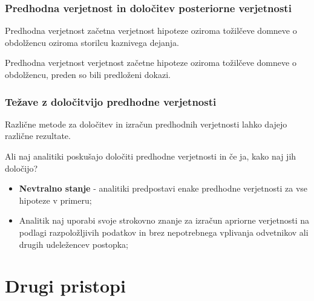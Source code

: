 \documentclass{beamer}
\begin{document}
\begin{frame}
    \frametitle{Predhodna verjetnost in določitev posteriorne verjetnosti}
    \begin{block}{Predhodna verjetnost}
        začetna verjetnost hipoteze oziroma tožilčeve domneve o obdolžencu oziroma storilcu kaznivega dejanja.
    \end{block} \vspace{3mm}
    \begin{block}{Predhodna verjetnost}
        verjetnost začetne hipoteze oziroma tožilčeve domneve o obdolžencu, preden so bili predloženi dokazi.
    \end{block}
\end{frame}

\begin{frame}
    \frametitle{Težave z določitvijo predhodne verjetnosti}
    Različne metode za določitev in izračun predhodnih verjetnosti lahko dajejo različne rezultate. \\ \vspace{3mm}
    \begin{block}{Ali naj analitiki poskušajo določiti predhodne verjetnosti in če ja, kako naj jih določijo?}
        \begin{itemize}
            \item \textbf{Nevtralno stanje} - analitiki predpostavi enake predhodne verjetnosti za vse hipoteze v primeru;
            \item Analitik naj uporabi svoje strokovno znanje za izračun apriorne verjetnosti na podlagi razpoložljivih podatkov in brez nepotrebnega vplivanja odvetnikov ali drugih udeležencev postopka;
        \end{itemize}
    \end{block}
\end{frame}

\section{Drugi pristopi}
\end{document}
